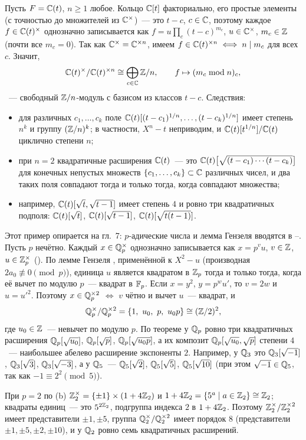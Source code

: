 \begin{example}[5.31g: поле $\CC(t)$]
Пусть $F=\mathbb C(t)$, $n\ge1$ любое. Кольцо $\mathbb C[t]$ факториально, его простые элементы (с точностью до множителей из
$\mathbb C^\times$)~--- это $t-c$, $c\in\mathbb C$, поэтому каждое $f\in\mathbb C(t)^\times$ однозначно записывается как
$f=u\prod_c(t-c)^{m_c}$, $u\in\mathbb C^\times$, $m_c\in\mathbb Z$ (почти все $m_c=0$). Так как $\mathbb C^\times=\mathbb C^{\times n}$, имеем
$f\in\mathbb C(t)^{\times n}\iff n\mid m_c$ для всех $c$. Значит,
\[
\mathbb C(t)^\times/\mathbb C(t)^{\times n}\cong\bigoplus_{c\in\mathbb C}\mathbb Z/n,\qquad f\mapsto(m_c\bmod n)_c,
\]
~--- свободный $\mathbb Z/n$-модуль с базисом из классов $t-c$. Следствия:
\begin{itemize}[leftmargin=*]
\item для различных $c_1,\dots,c_k$ поле $\mathbb C(t)[(t-c_1)^{1/n},\dots,(t-c_k)^{1/n}]$ имеет степень $n^k$ и группу
$(\mathbb Z/n)^k$; в частности, $X^n-t$ неприводим, и $\mathbb C(t)[t^{1/n}]/\mathbb C(t)$ циклично степени $n$;
\item при $n=2$ квадратичные расширения $\CC(t)$~--- это $\mathbb C(t)\bigl[\sqrt{(t-c_1)\cdots(t-c_k)}\bigr]$ для конечных
непустых множеств $\{c_1,\dots,c_k\}\subset\mathbb C$ различных чисел, и два таких поля совпадают тогда и только тогда, когда
совпадают множества;
\item например, $\mathbb C(t)[\sqrt t,\sqrt{t-1}]$ имеет степень $4$ и ровно три квадратичных подполя: $\mathbb C(t)[\sqrt t]$,
$\mathbb C(t)[\sqrt{t-1}]$, $\mathbb C(t)[\sqrt{t(t-1)}]$.
\end{itemize}
\end{example}

\begin{example}[5.31h: поле $\Qp$, $n=2$]
Этот пример опирается на гл.~7: $p$-адические числа и лемма Гензеля вводятся в --. Пусть $p$ нечётно.
Каждый $x\in\mathbb Q_p^\times$ однозначно записывается как $x=p^vu$, $v\in\mathbb Z$, $u\in\mathbb Z_p^\times$ (). По лемме Гензеля , применённой к $X^2-u$ (производная $2a_0\not\equiv0\pmod p$), единица $u$ является квадратом в $\mathbb Z_p$
тогда и только тогда, когда её вычет по модулю $p$~--- квадрат в $\mathbb F_p$. Если $x=y^2$, $y=p^wu'$, то $v=2w$ и $u=u'^2$.
Поэтому $x\in\mathbb Q_p^{\times2}$ $\iff$ $v$ чётно и вычет $u$~--- квадрат, и
\[
\Qp^\times/\Qp^{\times2}=\{1,\ u_0,\ p,\ u_0p\}\cong(\Z/2)^2,
\]
где $u_0\in\mathbb Z$~--- невычет по модулю $p$. По теореме  у $\Qp$ ровно три квадратичных расширения $\mathbb Q_p[\sqrt{u_0}]$,
$\mathbb Q_p[\sqrt p]$, $\mathbb Q_p[\sqrt{u_0p}]$, а их композит $\mathbb Q_p[\sqrt{u_0},\sqrt p]$ степени $4$~--- наибольшее абелево расширение
экспоненты $2$. Например, у $\mathbb Q_3$ это $\mathbb Q_3[\sqrt{-1}]$, $\mathbb Q_3[\sqrt3]$, $\mathbb Q_3[\sqrt{-3}]$, а у $\mathbb Q_5$~--- $\mathbb Q_5[\sqrt2]$,
$\mathbb Q_5[\sqrt5]$, $\mathbb Q_5[\sqrt{10}]$ (при этом $\sqrt{-1}\in\mathbb Q_5$, так как $-1\equiv2^2\pmod5$).

При $p=2$ по (b) $\mathbb Z_2^\times=\{\pm1\}\times(1+4\mathbb Z_2)$ и $1+4\mathbb Z_2=\{5^a\mid a\in\mathbb Z_2\}\cong\mathbb Z_2$; квадраты единиц~---
это $5^{2\mathbb Z_2}$, подгруппа индекса $2$ в $1+4\mathbb Z_2$. Поэтому $\mathbb Z_2^\times/\mathbb Z_2^{\times2}$ имеет представители $\pm1,\pm5$,
группа $\mathbb Q_2^\times/\mathbb Q_2^{\times2}$ имеет порядок $8$ (представители $\pm1,\pm5,\pm2,\pm10$), и у $\mathbb Q_2$ ровно семь
квадратичных расширений.
\end{example}


